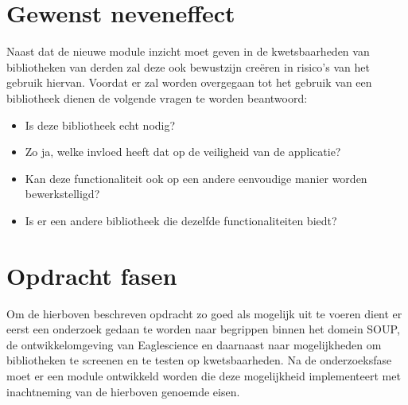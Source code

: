 
\section{Gewenst neveneffect}\label{sec:gewenst-neveneffect}
Naast dat de nieuwe module inzicht moet geven in de kwetsbaarheden van bibliotheken van derden zal deze ook bewustzijn creëren in risico's van het gebruik hiervan. Voordat er zal worden overgegaan tot het gebruik van een bibliotheek dienen de volgende vragen te worden beantwoord:
\begin{itemize}
	\item Is deze bibliotheek echt nodig?
	\item Zo ja, welke invloed heeft dat op de veiligheid van de applicatie?
	\item Kan deze functionaliteit ook op een andere eenvoudige manier worden bewerkstelligd?
	\item Is er een andere bibliotheek die dezelfde functionaliteiten biedt?

\end{itemize}


\section{Opdracht fasen}\label{sec:opdracht-fasen}
Om de hierboven beschreven opdracht zo goed als mogelijk uit te voeren dient er eerst een onderzoek gedaan te worden naar begrippen binnen het domein SOUP, de ontwikkelomgeving van Eaglescience en daarnaast naar mogelijkheden om bibliotheken te screenen en te testen op kwetsbaarheden. Na de onderzoeksfase moet er een module ontwikkeld worden die deze mogelijkheid implementeert met inachtneming van de hierboven genoemde eisen.

